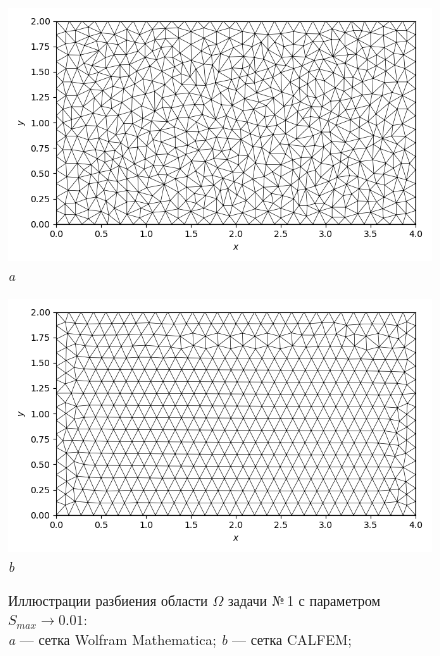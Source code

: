 \documentclass[12pt, a4paper]{article}
\begin{document}
			
			\begin{figure}[h]  
				\centering     
				\vspace{-2.0mm} 
				\begin{center} 
					{ 
						\begin{minipage}{0.47\textwidth} 
							\centering 
							\hspace*{-17.7mm}
							\includegraphics[width=1.2\columnwidth]{rect_dirichlet_only_001_net.png}\\ 
							\hspace*{-11mm}
							\textit{a} 
						\end{minipage}                                 
					} 
					{ 
						\begin{minipage}{0.47\textwidth} 
							\centering 
							\hspace*{-7.2mm}
							\includegraphics[width=1.2\columnwidth]{rect_dirichlet_only_001_calfem_net.png}\\
							\hspace*{7.2mm} 
							\textit{b} 
						\end{minipage}                                 
					} 				
				\end{center} 
				\vspace*{-0.0mm} 
				\caption{Иллюстрации разбиения области $\Omega$ задачи №\,1 с параметром $S_{max} \rightarrow 0.01$: \\
					\textit{a} --- сетка Wolfram Mathematica;
					\textit{b} --- сетка CALFEM;
				} 
				\label{fig: comp_mesh_calfem_wolfram}
			\end{figure}
			
\end{document}
